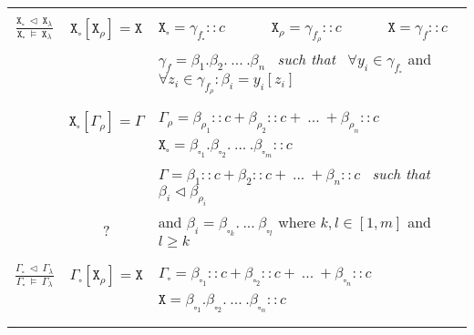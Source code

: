 \documentclass{entcs}
\renewcommand{\~}[0]{\texttildelow}
\begin{document}
\begin{defn}
\begin{center}
{\begin{tabular}{ c | | c | l }
    & & \\[0.02cm]
    \hline
    & & \\[0.02cm]

    $\frac{\mathtt{X}_{\square}~\lhd~\mathtt{X}_{\lambda}}{\mathtt{X}_{\square}~\models~\mathtt{X}_{\lambda}}$ & 
    $ \mathtt{X}_{\square}[\mathtt{X}_\rho] = \mathtt{X} $ & 
    $ \mathtt{X}_{\square} = \gamma_{f_{\square}}::c$ ~~~~~ $ \mathtt{X}_\rho = \gamma_{f_\rho}::c $ ~~~~~ $ \mathtt{X} = \gamma_{f}::c $\\

     &  & $\gamma_{f} = \beta_1.\beta_2.~...~.\beta_n $~ \emph{such that} ~$ \forall y_i \in \gamma_{f_{\square}}$ and $ \forall z_i \in \gamma_{f_\rho} : \beta_i = y_i[z_i]$ \\

	& & \\[0.02cm]
    \hline
    & & \\[0.02cm]

     & 
    $ \mathtt{X}_{\square}[\Gamma_\rho] = \Gamma $ & 
    $ \Gamma_\rho = \beta_{\rho_1}::c + \beta_{\rho_2}::c + ~...~+ \beta_{\rho_n}::c $ \\

	 &  & $ \mathtt{X}_{\square} = \beta_{\square_1}.\beta_{\square_2}.~...~.\beta_{\square_m}::c $\\

     &  & $ \Gamma = \beta_1::c + \beta_2::c + ~...~+ \beta_n::c $~ \emph{such that} ~$ \beta_i \lhd \beta_{\rho_i}$ \\

     & ? & and $ \beta_i = \beta_{\square_k}.~...~\beta_{\square_l}$ where $k, l \in [1, m]$ and $l \geq k $\\

    & & \\[0.02cm]
    \hline
    & & \\[0.02cm]

	$ \frac{\Gamma_{\square}~\lhd~\Gamma_\lambda}{\Gamma_{\square}~\models~\Gamma_\lambda} $ & 
    $ \Gamma_{\square}[\mathtt{X}_\rho] = \mathtt{X} $ & 
    $ \Gamma_{\square} = \beta_{\square_1}::c + \beta_{\square_2}::c + ~...~+ \beta_{\square_n}::c $\\

     &  & $ \mathtt{X} = \beta_{\square_1}.\beta_{\square_2}.~...~.\beta_{\square_n}::c $ \\

    & & \\[0.02cm]
    \hline
    & & \\[0.02cm]


\end{tabular}}
\end{center}
\end{defn}
\end{document}
